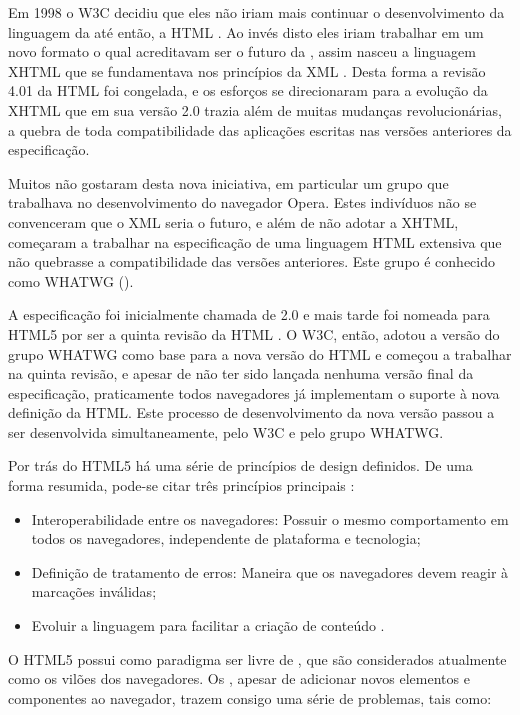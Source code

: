\documentclass[espaco=simples,appendix=Name]{abnt}
\begin{document}
Em 1998 o W3C decidiu que eles não iriam mais continuar o desenvolvimento da linguagem da  até então, a HTML . Ao invés disto eles iriam trabalhar em um novo formato o qual acreditavam ser o futuro da , assim nasceu a linguagem XHTML  que se fundamentava nos princípios da XML . Desta forma a revisão 4.01 da HTML foi congelada, e os esforços se direcionaram para a evolução da XHTML que em sua versão 2.0 trazia além de muitas mudanças revolucionárias, a quebra de toda compatibilidade das aplicações escritas nas versões anteriores da especificação.

Muitos não gostaram desta nova iniciativa, em particular um grupo que trabalhava no desenvolvimento do navegador Opera. Estes indivíduos não se convenceram que o XML seria o futuro, e além de não adotar a XHTML, começaram a trabalhar na especificação de uma linguagem HTML extensiva que não quebrasse a compatibilidade das versões anteriores. Este grupo é conhecido como WHATWG (). 

A especificação foi inicialmente chamada de  2.0 e mais tarde foi nomeada para HTML5 por ser a quinta revisão da HTML \cite{HTML5Intro}. O W3C, então, adotou a versão do grupo WHATWG como base para a nova versão do HTML e começou a trabalhar na quinta revisão, e apesar de não ter sido lançada nenhuma versão final da especificação, praticamente todos navegadores já implementam o suporte à nova definição da HTML. Este processo de desenvolvimento da nova versão passou a ser desenvolvida simultaneamente, pelo W3C e pelo grupo WHATWG.

Por trás do HTML5 há uma série de princípios de design definidos. De uma forma resumida, pode-se citar três princípios principais \cite{HTML5Intro}:
\begin{itemize}
		\item Interoperabilidade entre os navegadores: Possuir o mesmo comportamento em todos os navegadores, independente de plataforma e tecnologia;
		\item Definição de tratamento de erros: Maneira que os navegadores devem reagir à marcações inválidas;
		\item Evoluir a linguagem para facilitar a criação de conteúdo .
\end{itemize}

O HTML5 possui como paradigma ser livre de , que são considerados atualmente como os vilões dos navegadores. Os , apesar de adicionar novos elementos e componentes ao navegador, trazem consigo uma série de problemas, tais como:
\end{document}
